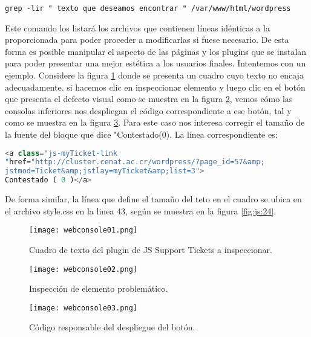 \begin{lstlisting} 
grep -lir " texto que deseamos encontrar " /var/www/html/wordpress
\end{lstlisting}
Este comando los listará los archivos que contienen líneas idénticas a la proporcionada para poder proceder  a modificarlas si fuese necesario. De esta forma es posible manipular el aspecto de las páginas y los plugins que se instalan para poder presentar una mejor estética a los usuarios finales. Intentemos con un ejemplo. Considere la figura \ref{fig:js:21} donde se presenta un cuadro cuyo texto no encaja adecuadamente. si hacemos clic en inspeccionar elemento y luego clic en el botón que presenta el defecto visual como se muestra en la figura \ref{fig:js:22}, vemos cómo las consolas inferiores nos despliegan el código correspondiente a ese botón, tal y como se muestra en la figura \ref{fig:js:23}. Para este caso nos interesa corregir el tamaño de la fuente del bloque que dice "Contestado(0). La línea correspondiente es:
\begin{lstlisting}[language=php]
<a class="js-myTicket-link 
"href="http://cluster.cenat.ac.cr/wordpress/?page_id=57&amp;
jstmod=Ticket&amp;jstlay=myTicket&amp;list=3">
Contestado ( 0 )</a>
\end{lstlisting}
De forma similar, la línea que define el tamaño del teto en el cuadro se ubica en el archivo style.css en la linea 43, según se muestra en la figura \ref{fig:js:24}.
\begin{figure}[H]
\centering
\texttt{[image: webconsole01.png]}
\caption{Cuadro de texto del plugin de JS Support Tickets a inspeccionar.}
\label{fig:js:21}
\end{figure}
\begin{figure}[H]
\centering
\texttt{[image: webconsole02.png]}
\caption{Inspección de elemento problemático.}
\label{fig:js:22}
\end{figure}
\begin{figure}[H]
\centering
\texttt{[image: webconsole03.png]}
\caption{Código responsable del despliegue del botón.}
\label{fig:js:23}
\end{figure}

